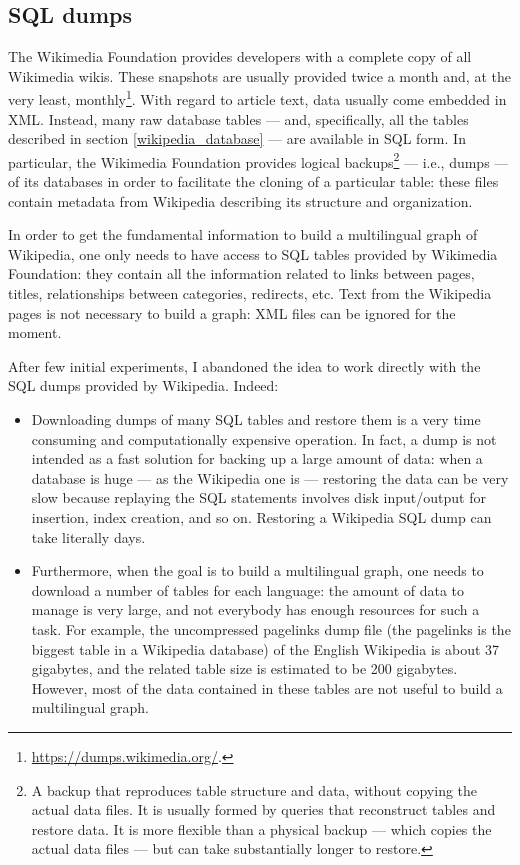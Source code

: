         \subsection{SQL dumps}
            The Wikimedia Foundation provides developers with a complete copy of all Wikimedia wikis. These snapshots are usually provided twice a month and, at the very least, monthly\footnote{\url{https://dumps.wikimedia.org/}.}. With regard to article text, data usually come embedded in XML. Instead, many raw database tables --- and, specifically, all the tables described in section \ref{wikipedia_database} --- are available in SQL form. In particular, the Wikimedia Foundation provides logical backups\footnote{A backup that reproduces table structure and data, without copying the actual data files. It is usually formed by queries that reconstruct tables and restore data. It is more flexible than a physical backup --- which copies the actual data files --- but can take substantially longer to restore.} --- i.e., dumps --- of its databases in order to facilitate the cloning of a particular table: these files contain metadata from Wikipedia describing its structure and organization.
            
            In order to get the fundamental information to build a multilingual graph of Wikipedia, one only needs to have access to SQL tables provided by Wikimedia Foundation: they contain all the information related to links between pages, titles,  relationships between categories, redirects, etc. Text from the Wikipedia pages is not necessary to build a graph: XML files can be ignored for the moment.
            
            After few initial experiments, I abandoned the idea to work directly with the SQL dumps provided by Wikipedia. Indeed:
            \begin{itemize}
                \item Downloading dumps of many SQL tables and restore them is a very time consuming and computationally expensive operation. In fact, a dump is not intended as a fast solution for backing up a large amount of data: when a database is huge --- as the Wikipedia one is --- restoring the data can be very slow because replaying the SQL statements involves disk input/output for insertion, index creation, and so on. Restoring a Wikipedia SQL dump can take literally days.
                \item Furthermore, when the goal is to build a multilingual graph, one needs to download a number of tables for each language: the amount of data to manage is very large, and not everybody has enough resources for such a task. For example, the uncompressed pagelinks dump file (the pagelinks is the biggest table in a Wikipedia database) of the English Wikipedia is about 37 gigabytes, and the related table size is estimated to be 200 gigabytes. However, most of the data contained in these tables are not useful to build a multilingual graph.
            \end{itemize}
